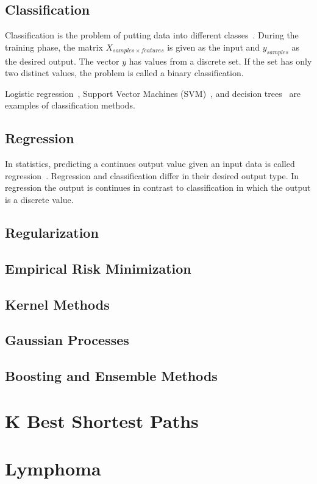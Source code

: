 \subsection{Classification}
Classification is the problem of putting data into different classes~\cite{classification}. During the training phase, the matrix $X_{samples \times features}$ is given as the input and $y_{samples}$ as the desired output. The vector $y$ has values from a discrete set. If the set has only two distinct values, the problem is called a binary classification.

Logistic regression~\cite{logistic-regression}, Support Vector Machines (SVM)~\cite{svm}, and decision trees~\cite{decision-trees} are examples of classification methods.

\subsection{Regression}
In statistics, predicting a continues output value given an input data is called regression~\cite{regression}. Regression and classification differ in their desired output type. In regression the output is continues in contrast to classification in which the output is a discrete value.



\subsection{Regularization}
\subsection{Empirical Risk Minimization}

\subsection{Kernel Methods}

\subsection{Gaussian Processes}

\subsection{Boosting and Ensemble Methods}

\section{K Best Shortest Paths}

\section{Lymphoma}

